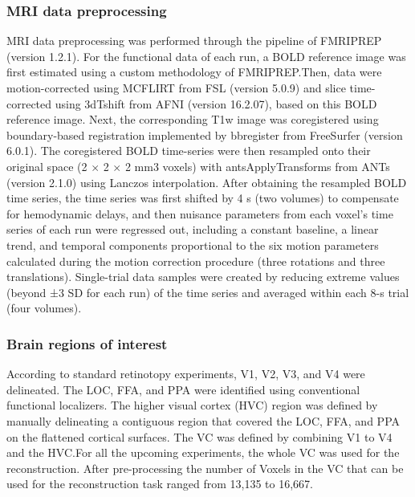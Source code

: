 \subsubsection{MRI data preprocessing}
MRI data preprocessing was performed through the pipeline of FMRIPREP (version 1.2.1). For the functional data of each run, a BOLD reference image was first estimated using a custom methodology of FMRIPREP.\@ Then, data were motion-corrected using MCFLIRT from FSL (version 5.0.9) and slice time-corrected using 3dTshift from AFNI (version 16.2.07), based on this BOLD reference image. Next, the corresponding T1w image was coregistered using boundary-based registration implemented by bbregister from FreeSurfer (version 6.0.1). The coregistered BOLD time-series were then resampled onto their original space (2 $\times$ 2 $\times$ 2 mm3 voxels) with antsApplyTransforms from ANTs (version 2.1.0) using Lanczos interpolation. After obtaining the resampled BOLD time series, the time series was first shifted by 4 s (two volumes) to compensate for hemodynamic delays, and then nuisance parameters from each voxel’s time series of each run were regressed out, including a constant baseline, a linear trend, and temporal components proportional to the six motion parameters calculated during the motion correction procedure (three rotations and three translations). Single-trial data samples were created by reducing extreme values (beyond ±3 SD for each run) of the time series and averaged within each 8-s trial (four volumes).

\subsubsection{Brain regions of interest}
According to standard retinotopy experiments\cite{engelFMRIHumanVisual1994,serenoBordersMultipleVisual1995}, V1, V2, V3, and V4 were delineated. The LOC, FFA, and PPA were identified using conventional functional localizers\cite{kanwisherFusiformFaceArea1997,epsteinCorticalRepresentationLocal1998,kourtziCorticalRegionsInvolved2000}. The higher visual cortex (HVC) region was defined by manually delineating a contiguous region that covered the LOC, FFA, and PPA on the flattened cortical surfaces. The VC was defined by combining V1 to V4 and the HVC.\@ For all the upcoming experiments, the whole VC was used for the reconstruction. After pre-processing the number of Voxels in the VC that can be used for the reconstruction task ranged from 13,135 to 16,667.


